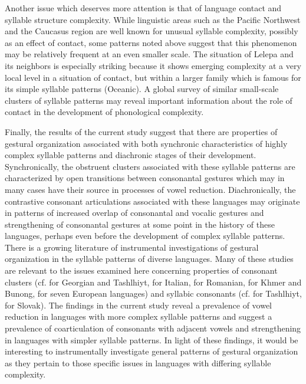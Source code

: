   Another issue which deserves more attention is that of language contact and syllable structure complexity. While linguistic areas such as the Pacific Northwest and the Caucasus region are well known for unusual syllable complexity, possibly as an effect of contact, some patterns noted above suggest that this phenomenon may be relatively frequent at an even smaller scale. The situation of Lelepa and its neighbors is especially striking because it shows emerging complexity at a very local level in a situation of contact, but within a larger family which is famous for its simple syllable patterns (Oceanic). A global survey of similar small-scale clusters of syllable patterns may reveal important information about the role of contact in the development of phonological complexity.

  Finally, the results of the current study suggest that there are properties of gestural organization associated with both synchronic characteristics of highly complex syllable patterns and diachronic stages of their development. Synchronically, the obstruent clusters associated with these syllable patterns are characterized by open transitions between consonantal gestures which may in many cases have their source in processes of vowel reduction. Diachronically, the contrastive consonant articulations associated with these languages may originate in patterns of increased overlap of consonantal and vocalic gestures and strengthening of consonantal gestures at some point in the history of these languages, perhaps even before the development of complex syllable patterns. There is a growing literature of instrumental investigations of gestural organization in the syllable patterns of diverse languages. Many of these studies are relevant to the issues examined here concerning properties of consonant clusters (cf. \citealt{GoldsteinEtAl2007} for Georgian and Tashlhiyt, \citealt{HermesEtAl2013} for Italian, \citealt{Marin2014} for Romanian, \citealt{Butler2015} for Khmer and Bunong, \citealt{MarinEtAl2017} for seven European languages) and syllabic consonants (cf. \citealt{HermesEtAl2011} for Tashlhiyt, \citealt{PouplierBeňuš2011} for Slovak). The findings in the current study reveal a prevalence of vowel reduction in languages with more complex syllable patterns and suggest a prevalence of coarticulation of consonants with adjacent vowels and strengthening in languages with simpler syllable patterns. In light of these findings, it would be interesting to instrumentally investigate general patterns of gestural organization as they pertain to those specific issues in languages with differing syllable complexity.

 
